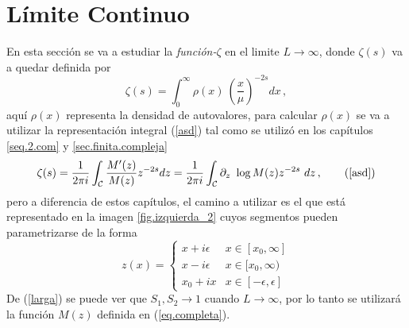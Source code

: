\chapter{Límite Continuo}\label{cap.continuo}

En esta sección se va a estudiar la {\it función-$\zeta $} en el limite $L \rightarrow \infty$, donde $\zeta  (s)$ va a quedar definida por
\begin{equation}
	\zeta (s) = \int _{0} ^{\infty} \rho (x) \ \left( \frac{x}{\mu } 			\right) ^{-2 s} dx
\, ,	
\label{eq.zeta.continuo}
\end{equation}
aquí $\rho(x) $ representa la densidad de autovalores, para calcular $\rho(x) $ se va a utilizar la representación integral (\ref{asd}) tal como se utilizó en los capítulos \ref{seq.2.com} y  \ref{sec.finita.compleja}
\begin{equation}
\zeta (s) = 
\frac{1}{2 \pi i} 
\int _{\mathcal{C}}
\frac{M ' ( z ) }{ M ( z ) } z ^{-2s} d z = 
\frac{1}{2 \pi i} 
\int _{\mathcal{C}}
\partial _z \ \log 	M(z)  z ^{-2s} \ dz
	\, ,
	\tag{\ref{asd}}
\end{equation}
pero a diferencia de estos capítulos, el camino a utilizar es el que está representado en la imagen \ref{fig.izquierda_2} cuyos segmentos pueden parametrizarse de la forma
\begin{equation}
z(x) =  
	  \begin{cases} 
      x + i \epsilon  &  x \in [x _0, \infty] \\
      x - i \epsilon  &  x \in  [ x_0, \infty) \\
      x _0 + i x	  &  x \in [-\epsilon,\epsilon]
   \end{cases}
\label{eq.para.con}
\end{equation}
De (\ref{larga}) se puede ver que $S _1,S _2 \rightarrow 1$ cuando $L \rightarrow \infty$, por lo tanto se utilizará la función $M (z)$ definida en (\ref{eq.completa}).


